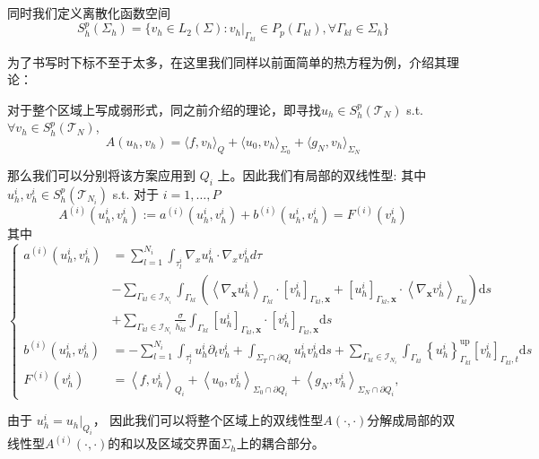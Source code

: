同时我们定义离散化函数空间 $$S_h^p(\Sigma_h)=\{v_h\in L_2(\Sigma):v_h|_{\Gamma_{kl}}\in P_p(\Gamma_{kl}),\forall \Gamma_{kl}\in \Sigma_h\}$$

为了书写时下标不至于太多，在这里我们同样以前面简单的热方程为例，介绍其理论： 

对于整个区域上写成弱形式，同之前介绍的理论，即寻找$u_h \in S_h^p(\mathscr{T}_N)$ s.t.$\forall v_h\in S_h^p(\mathscr{T}_N)$, 
$$A(u_h,v_h)=\langle f,v_h\rangle_Q+\langle u_0,v_h\rangle_{\Sigma_0}+\langle g_N,v_h\rangle_{\Sigma_N}$$ 

那么我们可以分别将该方案应用到 $Q_i$ 上。因此我们有局部的双线性型: 其中 $u_h^i,v_h^i \in S_h^p(\mathscr{T}_{N_i})$ s.t. 对于  $i=1, \ldots, P$
$$A^{(i)}(u_h^i, v_h^i):=a^{(i)}(u_h^i,v_h^i)+b^{(i)}(u_h^i,v_h^i)=F^{(i)}\left(v_{h}^{i}\right)$$
其中
\begin{equation}\label{hybrid}\left\{\begin{aligned}
    a^{(i)}(u_h^i,v_h^i)&=\sum_{l=1}^{N_i}\int_{\tau_l^i}\nabla_x u_h^i\cdot \nabla_x v_h^i d\tau\\
    &-\sum_{\Gamma_{k l} \in \mathcal{I}_{N_{i}}} \int_{\Gamma_{k l}}\left(\left\langle\nabla_{\boldsymbol{x}} u_{h}^{i}\right\rangle_{\Gamma_{k l}} \cdot\left[v_{h}^{i}\right]_{\Gamma_{k l}, \boldsymbol{x}} + \left[u_{h}^{i}\right]_{\Gamma_{k l}, \boldsymbol{x}} \cdot\left\langle\nabla_{\boldsymbol{x}} v_{h}^{i}\right\rangle_{\Gamma_{k l}}\right) \mathrm{d} s \\
    &+\sum_{\Gamma_{k l} \in \mathcal{I}_{N_{i}}} \frac{\sigma}{\overline{h_{k l}}} \int_{\Gamma_{k l}}\left[u_{h}^{i}\right]_{\Gamma_{k l}, \boldsymbol{x}} \cdot\left[v_{h}^{i}\right]_{\Gamma_{k l}, \boldsymbol{x}} \mathrm{d} s\\
    b^{(i)}\left(u_{h}^{i}, v_{h}^{i}\right)&= -\sum_{l=1}^{N_{i}} \int_{\tau_{l}^{i}} u_{h}^{i} \partial_{t} v_{h}^{i} +\int_{\Sigma_{T} \cap \partial Q_{i}} u_{h}^{i} v_{h}^{i} \mathrm{d} s 
     +\sum_{\Gamma_{k l} \in \mathcal{I}_{N_{i}} }\int_{\Gamma_{k l}}\left\{u_{h}^{i}\right\}_{\Gamma_{k l}}^{\mathrm{up}}\left[v_{h}^{i}\right]_{\Gamma_{k l}, t} \mathrm{d} s\\
    F^{(i)}\left(v_{h}^{i}\right)&=\left\langle f, v_{h}^{i}\right\rangle_{Q_{i}}+\left\langle u_{0}, v_{h}^{i}\right\rangle_{\Sigma_{0} \cap \partial Q_{i}}+\left\langle g_{N}, v_{h}^{i}\right\rangle_{\Sigma_{N} \cap \partial Q_{i}},
\end{aligned}\right.\end{equation}


由于  $u_{h}^{i}=u_{h}|_{Q_{i}}$， 因此我们可以将整个区域上的双线性型$A(\cdot, \cdot)$分解成局部的双线性型$A^{(i)}(\cdot, \cdot)$的和以及区域交界面$\Sigma_{h}$上的耦合部分。 

